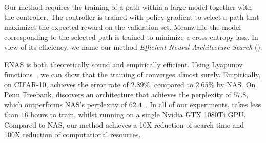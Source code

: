 Our method requires the training of a path within a large model together with the controller. The controller is trained with policy gradient to select a path that maximizes the expected reward on the validation set. Meanwhile the model corresponding to the selected path is trained to minimize a cross-entropy loss. In view of its efficiency, we name our method \textit{Efficient Neural Architecture Search} (\enasnospace).

ENAS is both theoretically sound and empirically efficient. Using Lyapunov functions~\citep{martingale_technique}, we can show that the training of \enas converges almost surely. Empirically, on CIFAR-10, \enas achieves the error rate of $2.89\%$, compared to $2.65\%$ by NAS. On Penn Treebank, \enas discovers an architecture that achieves the perplexity of $57.8$, which outperforms NAS's perplexity of $62.4$~\citep{nas}. In all of our experiments, \enas takes less than $16$ hours to train, whilst running on a single Nvidia GTX 1080Ti GPU. Compared to NAS, our method achieves a 10X reduction of search time and 100X reduction of computational resources.
